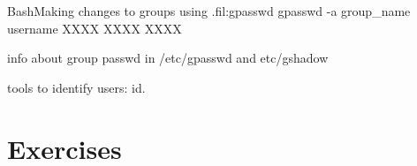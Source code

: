 \begin{command_line_float}{Bash}{Making changes to groups using .}{fil:gpasswd}
gpasswd -a group\_name username
XXXX
XXXX
XXXX
\end{command_line_float}

info about group passwd in /etc/gpasswd and etc/gshadow

tools to identify users: id.


\section*{Exercises}

\begin{exercises}
  \item 
\end{exercises}